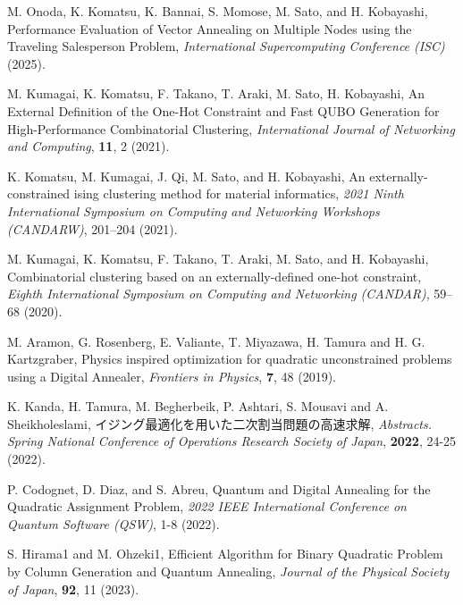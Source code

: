 \documentclass[submit,techrep,noauthor]{ipsj}
\begin{document}
\begin{thebibliography}{10}
M. Onoda, K. Komatsu, K. Bannai, S. Momose, M. Sato, and H. Kobayashi, Performance Evaluation of Vector Annealing  on Multiple Nodes using  the Traveling Salesperson Problem, {\it International Supercomputing Conference (ISC)} (2025).

M. Kumagai, K. Komatsu, F. Takano, T. Araki, M. Sato, H. Kobayashi, An External Definition of the One-Hot Constraint and Fast QUBO Generation for High-Performance Combinatorial Clustering, {\it International Journal of Networking and Computing}, {\bf 11}, 2 (2021).

K. Komatsu, M. Kumagai, J. Qi, M. Sato, and H. Kobayashi, An externally-constrained ising clustering method for material informatics,  {\it 2021 Ninth International Symposium on Computing and Networking Workshops (CANDARW)}, 201–204 (2021).

M. Kumagai, K. Komatsu, F. Takano, T. Araki, M. Sato, and H. Kobayashi, Combinatorial clustering based on an externally-defined one-hot constraint, {\it Eighth International Symposium on Computing and Networking (CANDAR)}, 59–68 (2020).

M. Aramon, G. Rosenberg, E. Valiante, T. Miyazawa, H. Tamura and H. G. Kartzgraber, Physics inspired optimization for quadratic unconstrained problems using a Digital Annealer, {\it Frontiers in Physics}, {\bf 7}, 48 (2019).

K. Kanda, H. Tamura, M. Begherbeik, P. Ashtari, S. Mousavi and A. Sheikholeslami, イジング最適化を用いた二次割当問題の高速求解, {\it Abstracts. Spring National Conference of Operations Research Society of Japan}, {\bf 2022}, 24-25 (2022).

P. Codognet, D. Diaz, and S. Abreu, Quantum and Digital Annealing for the Quadratic Assignment Problem, {\it 2022 IEEE International Conference on Quantum Software (QSW)}, 1-8 (2022).

S. Hirama1 and M. Ohzeki1, Efficient Algorithm for Binary Quadratic Problem by Column Generation and Quantum Annealing, {\it Journal of the Physical Society of Japan}, {\bf 92}, 11 (2023).

\end{thebibliography}
\end{document}
